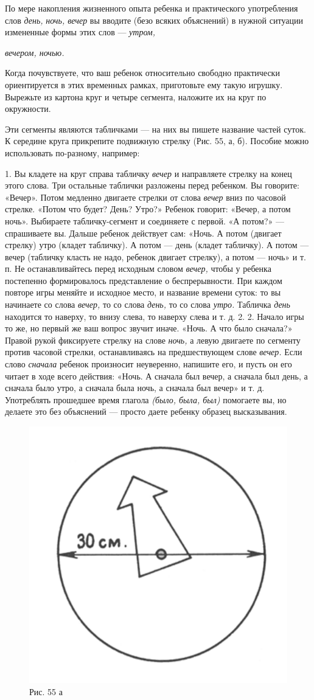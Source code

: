 \documentclass{book}
\renewcommand{\emph}[1]{\textit{#1}}
\begin{document}
По мере накопления жизненного опыта ребенка и практического употребления
слов \emph{день,} \emph{ночь, вечер} вы вводите (безо всяких объяснений)
в нужной ситуации измененные формы этих слов --- \emph{утром,}

\emph{вечером, ночью.}

Когда почувствуете, что ваш ребенок относительно свободно практически
ориентируется в этих временных рамках, приготовьте ему такую игрушку.
Вырежьте из картона круг и четыре сегмента, наложите их на круг по
окружности.

Эти сегменты являются табличками --- на них вы пишете название частей
суток. К середине круга прикрепите подвижную стрелку (Рис. 55, а, б).
Пособие можно использовать по-разному, например:

1. Вы кладете на круг справа табличку \emph{вечер} и направляете стрелку
на конец этого слова. Три остальные таблички разложены перед ребенком.
Вы говорите: «Вечер». Потом медленно двигаете стрелки от слова
\emph{вечер} вниз по часовой стрелке. «Потом что будет? День? Утро?»
Ребенок говорит: «Вечер, а потом ночь». Выбираете табличку-сегмент и
соединяете с первой. «А потом?» --- спрашиваете вы. Дальше ребенок
действует сам: «Ночь. А потом (двигает стрелку) утро (кладет табличку).
А потом --- день (кладет табличку). А потом --- вечер (табличку класть
не надо, ребенок двигает стрелку), а потом --- ночь» и т. п. Не
останавливайтесь перед исходным словом \emph{вечер,} чтобы у ребенка
постепенно формировалось представление о беспрерывности. При каждом
повторе игры меняйте и исходное место, и название времени суток: то вы
начинаете со слова \emph{вечер,} то со слова \emph{день,} то со слова
\emph{утро.} Табличка \emph{день} находится то наверху, то внизу слева,
то наверху слева и т. д. 2. 2. Начало игры то же, но первый же ваш
вопрос звучит иначе. «Ночь. А что было сначала?» Правой рукой фиксируете
стрелку на слове \emph{ночь,} а левую двигаете по сегменту против
часовой стрелки, останавливаясь на предшествующем слове \emph{вечер.}
Если слово \emph{сначала} ребенок произносит неуверенно, напишите его, и
пусть он его читает в ходе всего действия: «Ночь. А сначала был вечер, а
сначала был день, а сначала было утро, а сначала была ночь, а сначала
был вечер» и т. д. Употреблять прошедшее время глагола \emph{(было,
была, был)} помогаете вы, но делаете это без объяснений --- просто даете
ребенку образец высказывания.

\begin{figure}
\includegraphics[width=0.4\linewidth]{media/media/image51.png}
\caption*{Рис. 55 а}
\end{figure}
\end{document}
